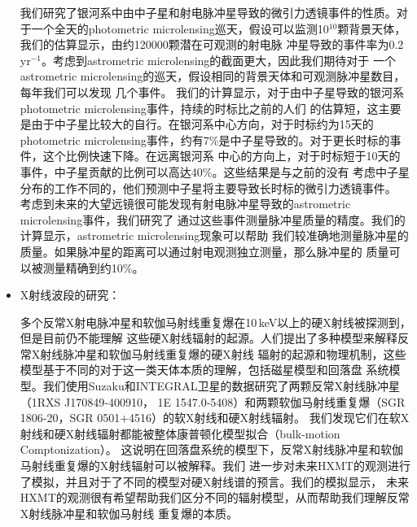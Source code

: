 \begin{itemize}
我们研究了银河系中由中子星和射电脉冲星导致的微引力透镜事件的性质。对于一个全天的photometric 
microlensing巡天，假设可以监测10$^{10}$颗背景天体，我们的估算显示，由约120000颗潜在可观测的射电脉
冲星导致的事件率为0.2\,yr$^{-1}$。考虑到astrometric microlensing的截面更大，因此我们期待对于
一个astrometric microlensing的巡天，假设相同的背景天体和可观测脉冲星数目，每年我们可以发现
几个事件。
%
我们的计算显示，对于由中子星导致的银河系photometric microlensing事件，持续的时标比之前的人们
的估算短，这主要是由于中子星比较大的自行。在银河系中心方向，对于时标约为15天的photometric 
microlensing事件，约有7\%是中子星导致的。对于更长时标的事件，这个比例快速下降。在远离银河系
中心的方向上，对于时标短于10天的事件，中子星贡献的比例可以高达40\%。这些结果是与之前的没有
考虑中子星分布的工作不同的，他们预测中子星将主要导致长时标的微引力透镜事件。
%
考虑到未来的大望远镜很可能发现有射电脉冲星导致的astrometric microlensing事件，我们研究了
通过这些事件测量脉冲星质量的精度。我们的计算显示，astrometric microlensing现象可以帮助
我们较准确地测量脉冲星的质量。如果脉冲星的距离可以通过射电观测独立测量，那么脉冲星的
质量可以被测量精确到约10\%。

\item X射线波段的研究：

多个反常X射电脉冲星和软伽马射线重复爆在10\,keV以上的硬X射线被探测到，但是目前仍不能理解
这些硬X射线辐射的起源。人们提出了多种模型来解释反常X射线脉冲星和软伽马射线重复爆的硬X射线
辐射的起源和物理机制，这些模型基于不同的对于这一类天体本质的理解，包括磁星模型和回落盘
系统模型。我们使用Suzaku和INTEGRAL卫星的数据研究了两颗反常X射线脉冲星（1RXS J170849‑400910，
1E 1547.0‑5408）和两颗软伽马射线重复爆（SGR 1806‑20，SGR 0501+4516）的软X射线和硬X射线辐射。
我们发现它们在软X射线和硬X射线辐射都能被整体康普顿化模型拟合（bulk-motion Comptonization）。
这说明在回落盘系统的模型下，反常X射线脉冲星和软伽马射线重复爆的X射线辐射可以被解释。我们
进一步对未来HXMT的观测进行了模拟，并且对于了不同的模型对硬X射线谱的预言。我们的模拟显示，
未来HXMT的观测很有希望帮助我们区分不同的辐射模型，从而帮助我们理解反常X射线脉冲星和软伽马射线
重复爆的本质。

\end{itemize}
\pkuthssffaq

